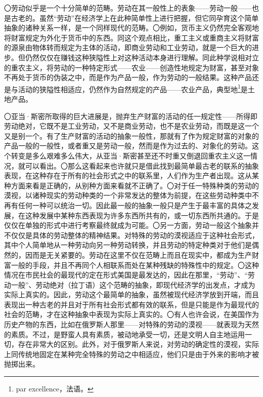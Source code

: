 \documentclass[a4paper,twoside,12pt]{ctexart}
\begin{document}
〇劳动似乎是一个十分简单的范畴。劳动在其一般性上的表象——劳动一般——也是古老的。虽然“劳动”在经济学上在此种简单性上进行把握，但它同孕育这个简单抽象的诸种关系一样，是一个同样现代的范畴。〇例如，货币主义仍然完全客观地将财富规定为外化于货币中的东西。同这个观点相比，重工主义或重商主义将财富的源泉由物体转而规定为主体的活动，即商业劳动和工业劳动，就是一个巨大的进步。但仍然仅仅在赚钱这种狭隘性上对这种活动本身进行理解。同此种学说相对立的重农主义，将劳动的一种特定形式——农业——创造性地规定为财富，甚至对象不再处于货币的伪装之中，而是作为产品一般，作为劳动的一般结果。这种产品还是与活动的狭隘性相适应，仍然作为自然规定的产品——农业产品，典型地\footnote{par excellence，法语。}是土地产品。

〇亚当·斯密所取得的巨大进展是，抛弃生产财富的活动的任一规定性——所得即劳动绝对，它既不是工业劳动，又不是商业劳动，也不是农业劳动，而既是这一个又是别一个。有了生产财富的活动的抽象一般性，那就有了作为规定财富的对象的产品一般的一般性，或者重又是劳动一般，然而是作为过去的、对象化的劳动。这个转变是多么艰难多么伟大，从亚当·斯密甚至还不时重又倒退回重农主义这一情况，就可以看出。〇那么这看起来也许就只是借此找到最简单最古老的联系的抽象表现，在这种存在于所有的社会形式之中的联系里，人们作为生产者出现。这从某种方面来看是正确的，从别种方面来看就不正确了。〇对于任一特殊种类的劳动的漠视，以诸种现实的劳动种类的一个非常发达的整体为前提，在这些劳动种类中不再有任何一种可以统治一切。因此最一般的抽象一般只是产生于最丰富的具体之发展，在这种发展中某种东西表现为许多东西所共有的，或一切东西所共通的。于是仅仅在单独的形式中进行考察最终就成为可能。〇另一方面，劳动一般这个抽象并不仅仅是具体的劳动整体的精神结果。对特殊的劳动的漠视适应于这种社会形式，其中个人简单地从一种劳动向另一种劳动转换，并且劳动的特定种类对于他们是偶然的，因而是无关紧要的。劳动在这里不仅在范畴上而且在现实中，都成为生产财富一般的手段，并且不再同个人相联系而处在某种残缺的特殊性中的规定。〇这种情况在市民社会的最现代的定在形式美国是最发达的，因此在那里，“劳动”、“劳动一般”、劳动绝对（拉丁语）这个范畴的抽象，即现代经济学的出发点，才成为实际上真实的。因此，劳动这个最简单的抽象，虽然被现代经济学放到开端，而且表现出一种古老的并且对于所有社会形式都有效的联系，但是只能是作为最现代的社会的范畴，才在这种抽象中表现为实际上真实的。〇有人也许会说，在美国作为历史产物的东西，比如在俄罗斯人那里——对特殊的劳动的漠视——就表现为天然的素质。不过，是野蛮人具有素质，被动地承受一切，还是文明人自主地运用一切，存在非常大的区别。此外，对于俄罗斯人来说，对劳动的确定性的漠视，实际上同传统地固定在某种完全特殊的劳动之中相适应，他们只是由于外来的影响才被抛掷出来。
\end{document}
